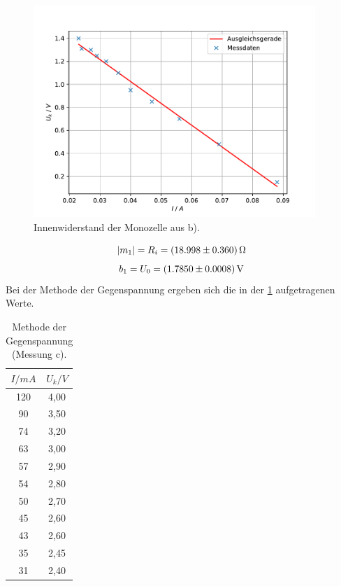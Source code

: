 \begin{figure}[h]
  \centering
  \includegraphics[height=8cm]{Auswertung/B_Innenwiderstand.pdf}
  \caption{Innenwiderstand der Monozelle aus b).}
  \label{fig:B_Innenwiderstand.pdf}
\end{figure}

\begin{equation}
    |m_1| = R_i = \SI{18,998 \pm 0,360}{\Omega} \notag
\end{equation}
\begin{equation}
    b_1 = U_0 = \SI{1,785 \pm 0,0008}{V} \notag
\end{equation}
\newpage
Bei der Methode der Gegenspannung ergeben sich die in der \ref{tab:c} aufgetragenen Werte.
\begin{table}[h!]
    \begin{center}
      \caption{Methode der Gegenspannung (Messung c).}
      \label{tab:c}
      \begin{tabular}{c|c} 
        \textbf{$I / mA$} & \textbf{$U_k / V$}\\
        \hline
		120 & 4,00 \\
		90 & 3,50 \\
		74 & 3,20 \\
		63 & 3,00 \\
		57 & 2,90 \\
		54 & 2,80 \\
		50 & 2,70 \\
		45 & 2,60 \\
		43 & 2,60 \\
		35 & 2,45 \\
		31 & 2,40 \\
      \end{tabular}
    \end{center}
\end{table}


